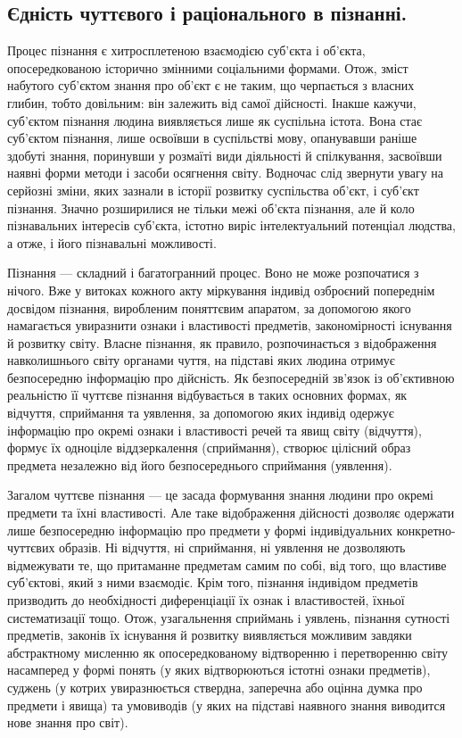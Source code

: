 \subsection{Єдність чуттєвого і раціонального в пізнанні.}
Процес пізнання є
хитросплетеною взаємодією суб’єкта і об’єкта, опосередкованою історично
змінними соціальними формами. Отож, зміст набутого суб’єктом знання про
об’єкт є не таким, що черпається з власних глибин, тобто довільним: він
залежить від самої дійсності. Інакше кажучи, суб’єктом пізнання людина
виявляється лише як суспільна істота. Вона стає суб’єктом пізнання, лише
освоївши в суспільстві мову, опанувавши раніше здобуті знання, поринувши у
розмаїті види діяльності й спілкування, засвоївши наявні форми методи і засоби
осягнення світу. Водночас слід звернути увагу на серйозні зміни, яких зазнали в
історії розвитку суспільства об’єкт, і суб’єкт пізнання. Значно розширилися не
тільки межі об’єкта пізнання, але й коло пізнавальних інтересів суб’єкта,
істотно виріс інтелектуальний потенціал людства, а отже, і його пізнавальні
можливості.

Пізнання --- складний і багатогранний процес. Воно не може розпочатися з
нічого. Вже у витоках кожного акту міркування індивід озброєний попереднім
досвідом пізнання, виробленим поняттєвим апаратом, за допомогою якого
намагається увиразнити ознаки і властивості предметів, закономірності
існування й розвитку світу. Власне пізнання, як правило, розпочинається з
відображення навколишнього світу органами чуття, на підставі яких людина
отримує безпосередню інформацію про дійсність. Як безпосередній зв’язок із
об’єктивною реальністю її чуттєве пізнання відбувається в таких основних
формах, як відчуття, сприймання та уявлення, за допомогою яких індивід
одержує інформацію про окремі ознаки і властивості речей та явищ світу
(відчуття), формує їх одноціле віддзеркалення (сприймання), створює цілісний
образ предмета незалежно від його безпосереднього сприймання (уявлення).

Загалом чуттєве пізнання --- це засада формування знання людини про
окремі предмети та їхні властивості. Але таке відображення дійсності дозволяє
одержати лише безпосередню інформацію про предмети у формі
індивідуальних конкретно-чуттєвих образів. Ні відчуття, ні сприймання, ні
уявлення не дозволяють відмежувати те, що притаманне предметам самим по
собі, від того, що властиве суб’єктові, який з ними взаємодіє. Крім того,
пізнання індивідом предметів призводить до необхідності диференціації їх
ознак і властивостей, їхньої систематизації тощо. Отож, узагальнення
сприймань i уявлень, пізнання сутності предметів, законів їх існування й
розвитку виявляється можливим завдяки абстрактному мисленню як
опосередкованому відтворенню і перетворенню світу насамперед у формі
понять (у яких відтворюються істотні ознаки предметів), суджень (у котрих
увиразнюється ствердна, заперечна або оцінна думка про предмети і явища) та
умовиводів (у яких на підставі наявного знання виводится нове знання про
світ).

